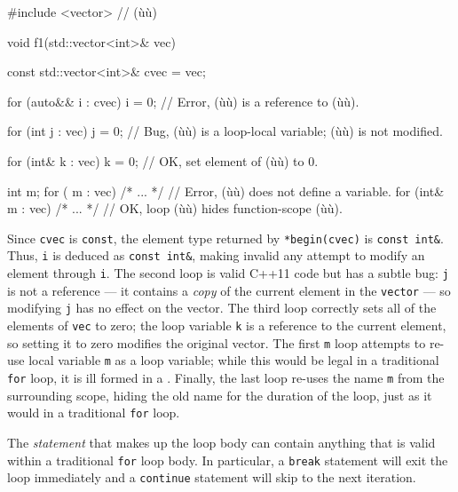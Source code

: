 {{\begin{emcppslisting}
#include <vector>  // (ù{}ù)

void f1(std::vector<int>& vec)
{
    const std::vector<int>& cvec = vec;

    for (auto&& i : cvec)
    {
        i = 0;  // Error, (ù{}ù) is a reference to (ù{}ù).
    }

    for (int j : vec)
    {
        j = 0;  // Bug, (ù{}ù) is a loop-local variable; (ù{}ù) is not modified.
    }

    for (int& k : vec)
    {
        k = 0;  // OK, set element of (ù{}ù) to 0.
    }

    int m;
    for (     m : vec) { /* ... */ }  // Error, (ù{}ù) does not define a variable.
    for (int& m : vec) { /* ... */ }  // OK, loop (ù{}ù) hides function-scope (ù{}ù).
}
\end{emcppslisting}


\noindent Since \lstinline!cvec! is \lstinline!const!, the element type returned by
\lstinline!*begin(cvec)! is \lstinline!const!~\lstinline!int&!. Thus, \lstinline!i!
is deduced as \lstinline!const!~\lstinline!int&!, making invalid any attempt
to modify an element through \lstinline!i!. The second loop is valid C++11
code but has a subtle bug: \lstinline!j! is not a reference --- it contains
a \emph{copy} of the current element in the \lstinline!vector! --- so
modifying \lstinline!j! has no effect on the vector. The third loop
correctly sets all of the elements of \lstinline!vec! to zero; the loop
variable \lstinline!k! is a reference to the current element, so setting it
to zero modifies the original vector. The first \lstinline!m! loop attempts
to re-use local variable \lstinline!m! as a loop variable; while this would
be legal in a traditional \lstinline!for! loop, it is ill formed in a
. Finally, the last loop re-uses
the name \lstinline!m! from the surrounding scope, hiding the old name for
the duration of the loop, just as it would in a traditional \lstinline!for!
loop.

The \emph{statement} that makes up the loop body can contain anything
that is valid within a traditional \lstinline!for! loop body. In
particular, a \lstinline!break! statement will exit the loop immediately
and a \lstinline!continue! statement will skip to the next iteration.

}}
